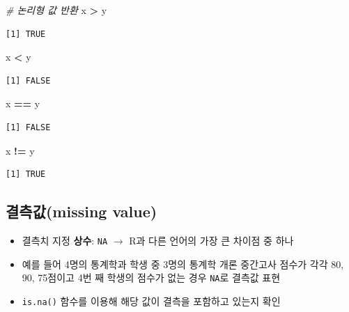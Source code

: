 \documentclass[
  11pt,
]{krantz}
\newenvironment{Shaded}{\begin{snugshade}}{\end{snugshade}}
\newcommand{\CommentTok}[1]{\textcolor[rgb]{0.37,0.37,0.37}{\textit{#1}}}
\newcommand{\NormalTok}[1]{#1}
\newcommand{\OperatorTok}[1]{\textcolor[rgb]{0.43,0.43,0.43}{\textbf{#1}}}
\newcommand{\StringTok}[1]{\textcolor[rgb]{0.5,0.5,0.5}{#1}}
\providecommand{\tightlist}{%
  \setlength{\itemsep}{0pt}\setlength{\parskip}{0pt}}
\begin{document}
\begin{Shaded}
\begin{Highlighting}[]
\CommentTok{# 논리형 값 반환}
\NormalTok{x }\OperatorTok{>}\StringTok{ }\NormalTok{y}
\end{Highlighting}
\end{Shaded}

\begin{verbatim}
[1] TRUE
\end{verbatim}

\begin{Shaded}
\begin{Highlighting}[]
\NormalTok{x }\OperatorTok{<}\StringTok{ }\NormalTok{y}
\end{Highlighting}
\end{Shaded}

\begin{verbatim}
[1] FALSE
\end{verbatim}

\begin{Shaded}
\begin{Highlighting}[]
\NormalTok{x }\OperatorTok{==}\StringTok{ }\NormalTok{y}
\end{Highlighting}
\end{Shaded}

\begin{verbatim}
[1] FALSE
\end{verbatim}

\begin{Shaded}
\begin{Highlighting}[]
\NormalTok{x }\OperatorTok{!=}\StringTok{ }\NormalTok{y}
\end{Highlighting}
\end{Shaded}

\begin{verbatim}
[1] TRUE
\end{verbatim}

\normalsize

\hypertarget{missing-value}{%
\subsection{결측값(missing value)}\label{missing-value}}

\begin{itemize}
\tightlist
\item
  결측치 지정 \textbf{상수}: \texttt{NA} \(\rightarrow\) R과 다른 언어의 가장 큰 차이점 중 하나
\item
  예를 들어 4명의 통계학과 학생 중 3명의 통계학 개론 중간고사 점수가 각각 80, 90, 75점이고 4번 째 학생의 점수가 없는 경우 \texttt{NA}로 결측값 표현
\item
  \texttt{is.na()} 함수를 이용해 해당 값이 결측을 포함하고 있는지 확인
\end{itemize}
\end{document}
